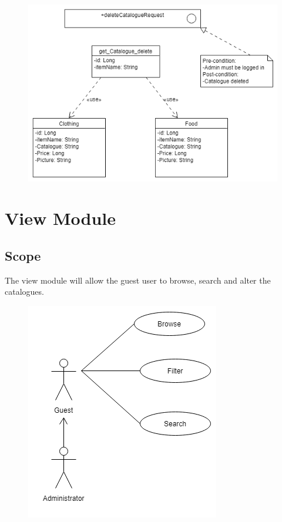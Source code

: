 \documentclass[12pt]{article}
\begin{document}
\begin{figure}[h]
\centering
\includegraphics[scale=0.5]{diagrams/notSeqD.png}
\end{figure}

\newpage
\section{View Module}
\subsection{Scope}
The view module will allow the guest user to browse, search and alter the catalogues.

\begin{figure}[h]
\centering
\includegraphics[scale=0.5]{diagrams/dataS.png}
\end{figure}
\newpage
\end{document}

